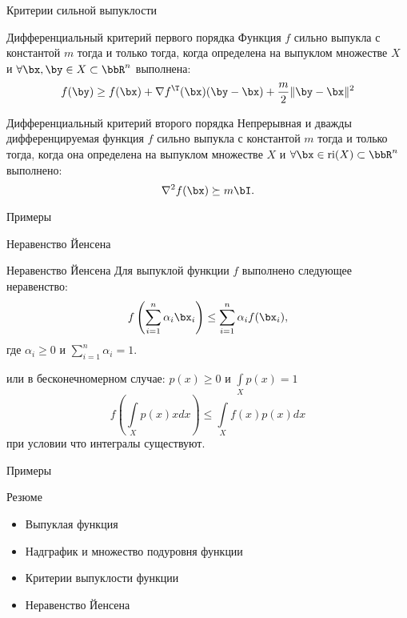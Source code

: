 \documentclass[12pt,russian]{beamer}
\begin{document}
\begin{frame}{Критерии сильной выпуклости}

\begin{block}{Дифференциальный критерий первого порядка}
Функция $f$ сильно выпукла с константой $m$ тогда и только тогда, когда определена на выпуклом множестве $X$ и $\forall \bx, \by \in X \subset \bbR^n$ выполнена:
\vspace{-4mm}
\[
f(\by) \geq f(\bx) + \nabla f^{\T}(\bx)(\by - \bx) + \frac{m}{2}\| \by - \bx \|^2
\]
\end{block}

\begin{block}{Дифференциальный критерий второго порядка}
Непрерывная и дважды дифференцируемая функция $f$ сильно выпукла с константой $m$ тогда и только тогда, когда она определена на выпуклом множестве $X$ и $\forall \bx \in \text{ri}(X) \subset \bbR^n$ выполнено:
\vspace{-2mm}
\[
\nabla^2 f(\bx) \succeq m\bI.
\]
\end{block}
\end{frame}

\begin{frame}{Примеры}

\end{frame}

\begin{frame}{Неравенство Йенсена}
 
\begin{block}{Неравенство Йенсена}
Для выпуклой функции $f$ выполнено следующее неравенство:
\vspace{-4mm}
\[
f\left( \sum\limits_{i=1}^n \alpha_i \bx_i \right) \leq \sum\limits_{i=1}^n \alpha_i f(\bx_i),
\vspace{-4mm}
\] 
где $\alpha_i \geq 0$ и $\sum\limits_{i=1}^n \alpha_i = 1$.
\end{block}

или в бесконечномерном случае: $p(x) \geq 0$ и $\int\limits_X p(x) = 1$ 
\vspace{-4mm}
\[
f\left( \int\limits_X p(x)xdx \right) \leq \int\limits_X f(x)p(x)dx
\]
при условии что интегралы существуют.

\end{frame}

\begin{frame}{Примеры}

\end{frame}

\begin{frame}{Резюме}
\begin{itemize}
\item Выпуклая функция
\item Надграфик и множество подуровня функции
\item Критерии выпуклости функции
\item Неравенство Йенсена
\end{itemize}
\end{frame}
\end{document}
